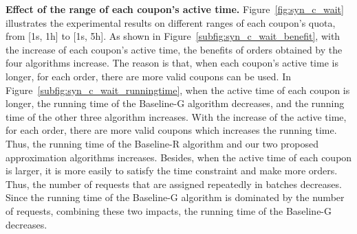 \textbf{Effect of the range of each coupon's active time.} Figure~\ref{fig:syn_c_wait} illustrates the experimental results on different ranges of each coupon's quota, from [1s, 1h] to [1s, 5h]. As shown in Figure~\ref{subfig:syn_c_wait_benefit}, with the increase of each coupon's active time, the benefits of orders obtained by the four algorithms increase. The reason is that, when each coupon's active time is longer, for each order, there are more valid coupons can be used. In Figure~\ref{subfig:syn_c_wait_runningtime}, when the active time of each coupon is longer, the running time of the Baseline-G algorithm decreases, and the running time of the other three algorithm increases. With the increase of the active time, for each order, there are more valid coupons which increases the running time. Thus, the running time of the Baseline-R algorithm and our two proposed approximation algorithms increases. Besides, when the active time of each coupon is larger, it is more easily to satisfy the time constraint and make more orders. Thus, the number of requests that are assigned repeatedly in batches decreases. Since the running time of the Baseline-G algorithm is dominated by the number of requests, combining these two impacts, the running time of the Baseline-G decreases.

